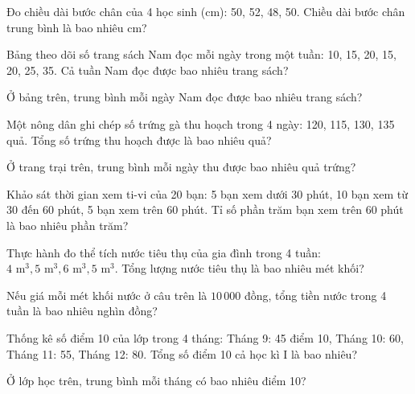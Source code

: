 \begin{ex}
  Đo chiều dài bước chân của 4 học sinh (cm): 50, 52, 48, 50. Chiều dài bước chân trung bình là bao nhiêu cm?
\end{ex}

\begin{ex}
  Bảng theo dõi số trang sách Nam đọc mỗi ngày trong một tuần: 10, 15, 20, 15, 20, 25, 35. Cả tuần Nam đọc được bao nhiêu trang sách?
\end{ex}

\begin{ex}
  Ở bảng trên, trung bình mỗi ngày Nam đọc được bao nhiêu trang sách?
\end{ex}

\begin{ex}
  Một nông dân ghi chép số trứng gà thu hoạch trong 4 ngày: 120, 115, 130, 135 quả. Tổng số trứng thu hoạch được là bao nhiêu quả?
\end{ex}

\begin{ex}
  Ở trang trại trên, trung bình mỗi ngày thu được bao nhiêu quả trứng?
\end{ex}

\begin{ex}
  Khảo sát thời gian xem ti-vi của 20 bạn: 5 bạn xem dưới 30 phút, 10 bạn xem từ 30 đến 60 phút, 5 bạn xem trên 60 phút. Tỉ số phần trăm bạn xem trên 60 phút là bao nhiêu phần trăm?
\end{ex}

\begin{ex}
  Thực hành đo thể tích nước tiêu thụ của gia đình trong 4 tuần: $4\text{ m}^3, 5\text{ m}^3, 6\text{ m}^3, 5\text{ m}^3$. Tổng lượng nước tiêu thụ là bao nhiêu mét khối?
\end{ex}

\begin{ex}
  Nếu giá mỗi mét khối nước ở câu trên là $10\,000$ đồng, tổng tiền nước trong 4 tuần là bao nhiêu nghìn đồng?
\end{ex}

\begin{ex}
  Thống kê số điểm 10 của lớp trong 4 tháng: Tháng 9: 45 điểm 10, Tháng 10: 60, Tháng 11: 55, Tháng 12: 80. Tổng số điểm 10 cả học kì I là bao nhiêu?
\end{ex}

\begin{ex}
  Ở lớp học trên, trung bình mỗi tháng có bao nhiêu điểm 10?
\end{ex}
